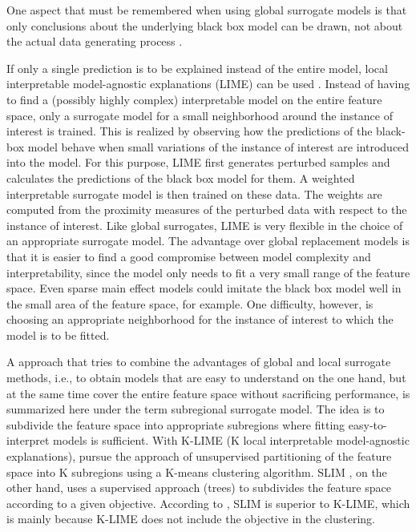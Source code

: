 One aspect that must be remembered when using global surrogate models is that only conclusions about the underlying black box model can be drawn, not about the actual data generating process \citep{Molnar.2019}.


If only a single prediction is to be explained instead of the entire model, local interpretable model-agnostic explanations (LIME) can be used \citep{Ribeiro.2016}. Instead of having to find a (possibly highly complex) interpretable model on the entire feature space, only a surrogate model for a small neighborhood around the instance of interest is trained. This is realized by observing how the predictions of the black-box model behave when small variations of the instance of interest are introduced into the model. For this purpose, LIME first generates perturbed samples and calculates the predictions of the black box model for them. A weighted interpretable surrogate model is then trained on these data. The weights are computed from the proximity measures of the perturbed data with respect to the instance of interest. 
Like global surrogates, LIME is very flexible in the choice of an appropriate surrogate model. The advantage over global replacement models is that it is easier to find a good compromise between model complexity and interpretability, since the model only needs to fit a very small range of the feature space. Even sparse main effect models could imitate the black box model well in the small area of the feature space, for example. One difficulty, however, is choosing an appropriate neighborhood for the instance of interest to which the model is to be fitted.
\citep{Molnar.2019}


A approach that tries to combine the advantages of global and local surrogate methods, i.e., to obtain models that are easy to understand on the one hand, but at the same time cover the entire feature space without sacrificing performance, is summarized here under the term subregional surrogate model.
The idea is to subdivide the feature space into appropriate subregions where fitting easy-to-interpret models is sufficient.
With K-LIME (K local interpretable model-agnostic explanations), \citet{Hall.2017}  pursue the approach of unsupervised partitioning of the feature space into K subregions using a K-means clustering algorithm. 
SLIM \citep{Hu.2020}, on the other hand, uses a supervised approach (trees) to subdivides the feature space according to a given objective. According to \citep{Hu.2018}, SLIM is superior to K-LIME, which is mainly because K-LIME does not include the objective in the clustering. 

